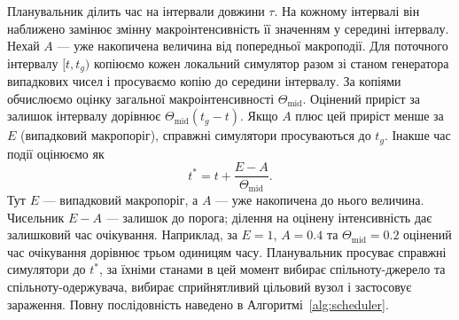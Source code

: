 Планувальник ділить час на інтервали довжини $\tau$.
На кожному інтервалі він наближено замінює змінну
макроінтенсивність її значенням у середині інтервалу. Нехай $A$ --- уже накопичена величина від попередньої макроподії. Для поточного інтервалу $[t,t_g)$ копіюємо кожен локальний симулятор разом зі станом генератора випадкових чисел і просуваємо копію до середини інтервалу. За копіями обчислюємо оцінку загальної макроінтенсивності $\Theta_{\mathrm{mid}}$. Оцінений приріст за залишок інтервалу дорівнює $\Theta_{\mathrm{mid}}(t_g-t)$. Якщо $A$ плюс цей приріст менше за $E$ (випадковий макропоріг), справжні симулятори просуваються до $t_g$. Інакше час події оцінюємо як
\begin{equation}
\label{eq:interpolation}
t^\ast=t+\frac{E-A}{\Theta_{\mathrm{mid}}}.
\end{equation}
Тут $E$ --- випадковий макропоріг, а $A$ --- уже накопичена до нього величина. Чисельник $E-A$ --- залишок до порога; ділення на оцінену інтенсивність дає залишковий час очікування. Наприклад, за $E=1$, $A=0.4$ та $\Theta_{\mathrm{mid}}=0.2$ оцінений час очікування дорівнює трьом одиницям часу. Планувальник просуває справжні симулятори до $t^\ast$, за їхніми станами в цей момент вибирає спільноту-джерело та спільноту-одержувача, вибирає сприйнятливий цільовий вузол і застосовує зараження. Повну послідовність наведено в Алгоритмі~\ref{alg:scheduler}.


